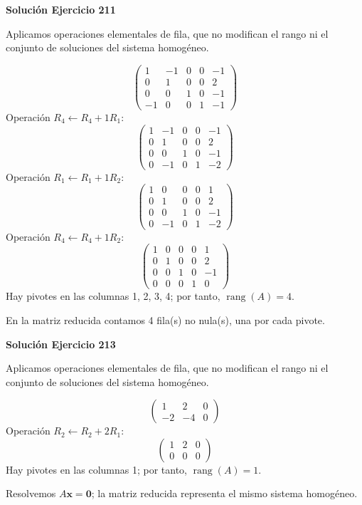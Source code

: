 \documentclass[12pt]{article}
\theoremstyle{remark}
\newcommand{\rang}{\operatorname{rang}}
\newcommand{\vect}[1]{\boldsymbol{#1}}
\begin{document}
\par\bigskip\noindent\textbf{Solución Ejercicio 211}\par\nobreak
Aplicamos operaciones elementales de fila, que no modifican el rango ni el conjunto de soluciones del sistema homogéneo.

\[
\begin{pmatrix}1&-1&0&0&-1\\0&1&0&0&2\\0&0&1&0&-1\\-1&0&0&1&-1\end{pmatrix}
\]
Operación $R_{4}\leftarrow R_{4}+1R_{1}$:
\[
\begin{pmatrix}1&-1&0&0&-1\\0&1&0&0&2\\0&0&1&0&-1\\0&-1&0&1&-2\end{pmatrix}
\]
Operación $R_{1}\leftarrow R_{1}+1R_{2}$:
\[
\begin{pmatrix}1&0&0&0&1\\0&1&0&0&2\\0&0&1&0&-1\\0&-1&0&1&-2\end{pmatrix}
\]
Operación $R_{4}\leftarrow R_{4}+1R_{2}$:
\[
\begin{pmatrix}1&0&0&0&1\\0&1&0&0&2\\0&0&1&0&-1\\0&0&0&1&0\end{pmatrix}
\]
Hay pivotes en las columnas 1, 2, 3, 4; por tanto, $\boxed{\rang(A)=4}$.

En la matriz reducida contamos 4 fila(s) no nula(s), una por cada pivote.


\par\bigskip\noindent\textbf{Solución Ejercicio 213}\par\nobreak
Aplicamos operaciones elementales de fila, que no modifican el rango ni el conjunto de soluciones del sistema homogéneo.

\[
\begin{pmatrix}1&2&0\\-2&-4&0\end{pmatrix}
\]
Operación $R_{2}\leftarrow R_{2}+2R_{1}$:
\[
\begin{pmatrix}1&2&0\\0&0&0\end{pmatrix}
\]
Hay pivotes en las columnas 1; por tanto, $\boxed{\rang(A)=1}$.

Resolvemos $A\vect x=\vect0$; la matriz reducida representa el mismo sistema homogéneo.
\end{document}
